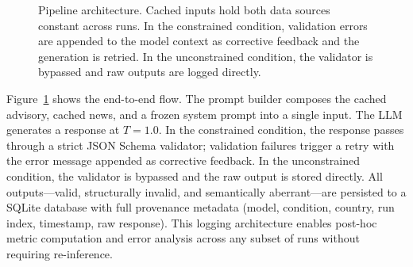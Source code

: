 \documentclass[sigconf]{acmart}
\begin{document}
\begin{figure}[t]
\centering
{}
\caption{Pipeline architecture. Cached inputs hold both data sources constant across runs. In the constrained condition, validation errors are appended to the model context as corrective feedback and the generation is retried. In the unconstrained condition, the validator is bypassed and raw outputs are logged directly.}
\label{fig:architecture}
\end{figure}

Figure~\ref{fig:architecture} shows the end-to-end flow. The prompt builder composes the cached advisory, cached news, and a frozen system prompt into a single input. The LLM generates a response at $T{=}1.0$. In the constrained condition, the response passes through a strict JSON Schema validator; validation failures trigger a retry with the error message appended as corrective feedback. In the unconstrained condition, the validator is bypassed and the raw output is stored directly. All outputs---valid, structurally invalid, and semantically aberrant---are persisted to a SQLite database with full provenance metadata (model, condition, country, run index, timestamp, raw response). This logging architecture enables post-hoc metric computation and error analysis across any subset of runs without requiring re-inference.
\end{document}
